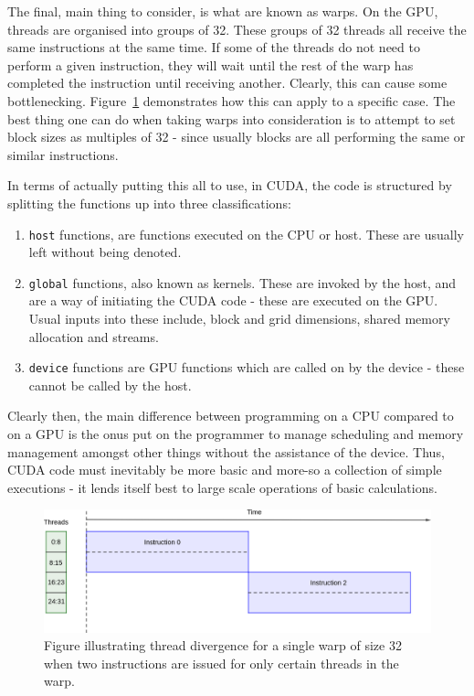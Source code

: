The final, main thing to consider, is what are known as warps. On the GPU, threads are organised into groups of 32. These groups of 32 threads all receive the same instructions at the same time. If some of the threads do not need to perform a given instruction, they will wait until the rest of the warp has completed the instruction until receiving another. Clearly, this can cause some bottlenecking. Figure~\ref{fig:warps} demonstrates how this can apply to a specific case. The best thing one can do when taking warps into consideration is to attempt to set block sizes as multiples of 32 - since usually blocks are all performing the same or similar instructions.

In terms of actually putting this all to use, in CUDA, the code is structured by splitting the functions up into three classifications:
\begin{enumerate}
	\item \texttt{\twound host\twound} functions, are functions executed on the CPU or host. These are usually left without being denoted.
	\item \texttt{\twound global\twound} functions, also known as kernels. These are invoked by the host, and are a way of initiating the CUDA code - these are executed on the GPU. Usual inputs into these include, block and grid dimensions, shared memory allocation and streams.
	\item \texttt{\twound device\twound} functions are GPU functions which are called on by the device - these cannot be called by the host.
\end{enumerate}
Clearly then, the main difference between programming on a CPU compared to on a GPU is the onus put on the programmer to manage scheduling and memory management amongst other things without the assistance of the device. Thus, CUDA code must inevitably be more basic and more-so a collection of simple executions - it lends itself best to large scale operations of basic calculations.
\begin{figure}
	\centering
	\includegraphics[width = 0.8\linewidth]{Figures/warps}
	\caption{Figure illustrating thread divergence for a single warp of size 32 when two instructions are issued for only certain threads in the warp.}
	\label{fig:warps}
\end{figure}

